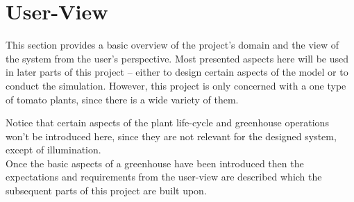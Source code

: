 \section{User-View}\label{sec:user-view}


This section provides a basic overview of the project's domain and the view of the system from the user's perspective.
Most presented aspects here will be used in later parts of this project -- either to design certain aspects of the model
or to conduct the simulation.
However, this project is only concerned with a one type of tomato plants, since there is a wide variety of them.

Notice that certain aspects of the plant life-cycle and greenhouse operations won't be introduced here,
since they are not relevant for the designed system, except of illumination.\\

Once the basic aspects of a greenhouse have been introduced then the expectations and requirements
from the user-view are described which the subsequent parts of this project are built upon.
